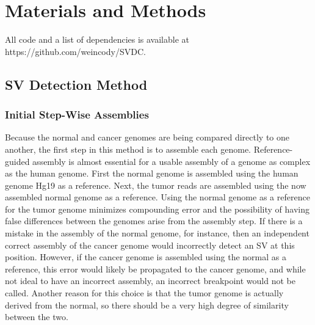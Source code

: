 \documentclass{easychithesis}
\begin{document}
\chapter{Materials and Methods}
All code and a list of dependencies is available at https:\slash \slash github.com\slash weincody\slash SVDC.

\section{SV Detection Method}
\subsection{Initial Step-Wise Assemblies}
Because the normal and cancer genomes are being compared directly to one another, the first step in this method is to assemble each genome. Reference-guided assembly is almost essential for a usable assembly of a genome as complex as the human genome. First the normal genome is assembled using the human genome Hg19 as a reference. Next, the tumor reads are assembled using the now assembled normal genome as a reference. Using the normal genome as a reference for the tumor genome minimizes compounding error and the possibility of having false differences between the genomes arise from the assembly step. If there is a mistake in the assembly of the normal genome, for instance, then an independent correct assembly of the cancer genome would incorrectly detect an SV at this position. However, if the cancer genome is assembled using the normal as a reference, this error would likely be propagated to the cancer genome, and while not ideal to have an incorrect assembly, an incorrect breakpoint would not be called. Another reason for this choice is that the tumor genome is actually derived from the normal, so there should be a very high degree of similarity between the two.
\end{document}
